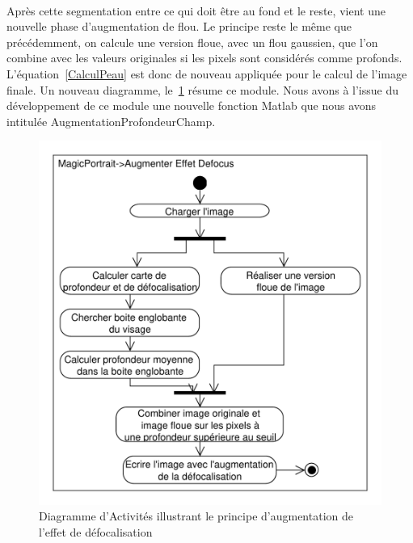 \documentclass[11pt, french]{report-rd-info}
\begin{document}
\paragraph*{}
Après cette segmentation entre ce qui doit être au fond et le reste, vient une nouvelle phase d'augmentation de flou. Le principe reste le même que précédemment, on calcule une version floue, avec un flou gaussien, que
l'on combine avec les valeurs originales si les pixels sont considérés comme profonds. L'équation~\ref{CalculPeau} est donc de nouveau appliquée pour le calcul de l'image finale. Un nouveau diagramme, le~\ref{diag:diagramme20} résume ce module. Nous avons à l'issue du développement de ce module une nouvelle fonction Matlab que nous avons intitulée AugmentationProfondeurChamp.

\begin{figure}
\centering
\includegraphics[scale=0.5]{Diagrammes/DiagrammeActivites_20_Profondeur}
\caption{Diagramme d'Activités illustrant le principe d'augmentation de l'effet de défocalisation}
\label{diag:diagramme20}
\end{figure}
\end{document}
